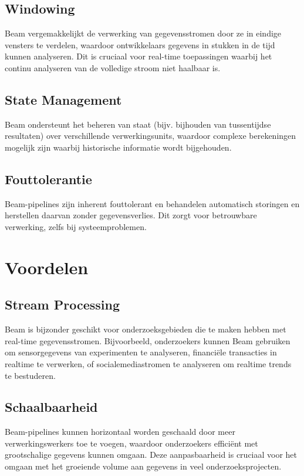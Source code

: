 \subsection{Windowing}
Beam vergemakkelijkt de verwerking van gegevensstromen door ze in eindige vensters te verdelen, waardoor ontwikkelaars gegevens in stukken in de tijd kunnen analyseren. Dit is cruciaal voor real-time toepassingen waarbij het continu analyseren van de volledige stroom niet haalbaar is.

\subsection{State Management}
Beam ondersteunt het beheren van staat (bijv. bijhouden van tussentijdse resultaten) over verschillende verwerkingsunits, waardoor complexe berekeningen mogelijk zijn waarbij historische informatie wordt bijgehouden.

\subsection{Fouttolerantie}
Beam-pipelines zijn inherent fouttolerant en behandelen automatisch storingen en herstellen daarvan zonder gegevensverlies. Dit zorgt voor betrouwbare verwerking, zelfs bij systeemproblemen.

\section{Voordelen}

\subsection{Stream Processing}
Beam is bijzonder geschikt voor onderzoeksgebieden die te maken hebben met real-time gegevensstromen. Bijvoorbeeld, onderzoekers kunnen Beam gebruiken om sensorgegevens van experimenten te analyseren, financiële transacties in realtime te verwerken, of socialemediastromen te analyseren om realtime trends te bestuderen.

\subsection{Schaalbaarheid}
Beam-pipelines kunnen horizontaal worden geschaald door meer verwerkingswerkers toe te voegen, waardoor onderzoekers efficiënt met grootschalige gegevens kunnen omgaan. Deze aanpasbaarheid is cruciaal voor het omgaan met het groeiende volume aan gegevens in veel onderzoeksprojecten.

